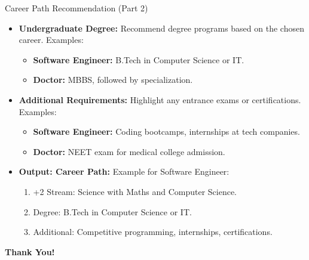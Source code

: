\documentclass{beamer}
\begin{document}
\begin{frame}{Career Path Recommendation (Part 2)}
    \begin{itemize}
        \item \textbf{Undergraduate Degree:}
        Recommend degree programs based on the chosen career. Examples:
        \begin{itemize}
            \item \textbf{Software Engineer:} B.Tech in Computer Science or IT.
            \item \textbf{Doctor:} MBBS, followed by specialization.
        \end{itemize}

        \item \textbf{Additional Requirements:}
        Highlight any entrance exams or certifications. Examples:
        \begin{itemize}
            \item \textbf{Software Engineer:} Coding bootcamps, internships at tech companies.
            \item \textbf{Doctor:} NEET exam for medical college admission.
        \end{itemize}

        \item \textbf{Output: Career Path:}
        Example for Software Engineer:
        \begin{enumerate}
            \item +2 Stream: Science with Maths and Computer Science.
            \item Degree: B.Tech in Computer Science or IT.
            \item Additional: Competitive programming, internships, certifications.
        \end{enumerate}
    \end{itemize}
\end{frame}

\begin{frame}
\centering
\Huge
\textbf{Thank You!}

\vspace{2cm}
\end{frame}
\end{document}
